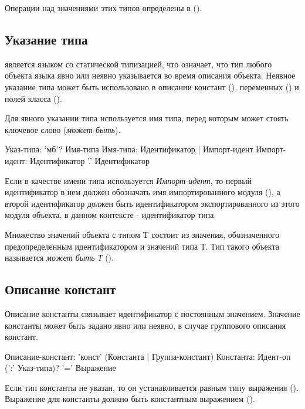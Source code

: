 \bigskip
Операции над значениями этих типов определены в ().

\hypertarget{type-ref}{%
\subsection{Указание типа}\label{decls:type-ref}}

\thelang{} является языком со статической типизацией, что означает, что тип любого объекта языка явно или неявно указывается во время описания объекта. 
Неявное указание типа может быть использовано в описании констант (), переменных () и полей класса ().

Для явного указании типа используется имя типа, перед которым может стоять ключевое слово  (\emph{может быть}). 

\begin{Grammar}
Указ-типа: 'мб'? Имя-типа 
Имя-типа: Идентификатор | Импорт-идент
Импорт-идент: Идентификатор '.' Идентификатор
\end{Grammar} 

Если в качестве имени типа используется \emph{Импорт-идент}, то первый идентификатор в нем должен обозначать имя импортированного модуля (), а второй идентификатор должен быть идентификатором экспортированного из этого модуля объекта, в данном контексте - идентификатор типа.

Множество значений объекта с типом  T состоит из значения, обозначенного предопределенным идентификатором   и значений типа Т. 
Тип такого объекта называется \emph{может быть Т} (). 

\hypertarget{constants}{%
\subsection{Описание констант}\label{decls:constants}}

Описание константы связывает идентификатор с постоянным значением. 
Значение константы может быть задано явно или неявно, в случае группового описания констант.

\begin{Grammar}
Описание-констант: 'конст' (Константа | Группа-констант)
Константа: Идент-оп (':' Указ-типа)? '=' Выражение
\end{Grammar} 

Если тип константы не указан, то он устанавливается равным типу выражения ().
Выражение для константы должно быть константным выражением ().

